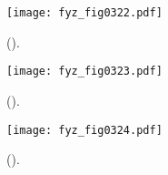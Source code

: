   \begin{figure}[ht!]  %
    \centering
    \texttt{[image: fyz\_fig0322.pdf]}
    \caption{
             (\cite[s.~148]{Feynman02}).}
    \label{fyz:fig0322}
  \end{figure}
  
  \begin{figure}[ht!]  %
    \centering
    \texttt{[image: fyz\_fig0323.pdf]}
    \caption{
             (\cite[s.~148]{Feynman02}).}
    \label{fyz:fig0323}
  \end{figure}
  
  \begin{figure}[ht!]  %
    \centering
    \texttt{[image: fyz\_fig0324.pdf]}
    \caption{
             (\cite[s.~148]{Feynman02}).}
    \label{fyz:fig0324}
  \end{figure}

  \begin{figure}[hb!]
    \centering
    \caption{ }
    \label{fyz:fig0325}
  \end{figure}

